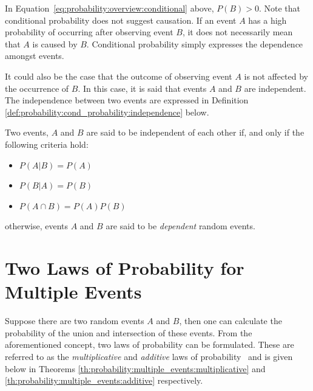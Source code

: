 \noindent
In Equation~\eqref{eq:probability:overview:conditional} above, $P(B) > 0$. Note that conditional probability does not suggest causation. If an event $A$ has a high probability of occurring after observing event $B$, it does not necessarily mean that $A$ is caused by $B$. Conditional probability simply expresses the dependence amongst events.

It could also be the case that the outcome of observing event $A$ is not affected by the occurrence of $B$. In this case, it is said that events $A$ and $B$ are independent. The independence between two events are expressed in Definition \ref{def:probability:cond_probability:independence} below.
\\
\begin{definition}
      \label{def:probability:cond_probability:independence}
      Two events, $A$ and $B$ are said to be independent of each other if, and only if the following criteria hold:

      \begin{itemize}
            \item $P(A \vert B) = P(A)$
            \item $P(B \vert A) = P(B)$
            \item $P(A \cap B) = P(A)P(B)$
      \end{itemize}

      \noindent
      otherwise, events $A$ and $B$ are said to be \textit{dependent} random events.
\end{definition}

\section{Two Laws of Probability for Multiple Events}\label{sec:probability:multiple_events}

Suppose there are two random events $A$ and $B$, then one can calculate the probability of the union and intersection of these events. From the aforementioned concept, two laws of probability can be formulated. These are referred to as the \textit{multiplicative} and \textit{additive} laws of probability~\cite{ref:wackerly:2014} and is given below in Theorems \ref{th:probability:multiple_events:multiplicative} and \ref{th:probability:multiple_events:additive} respectively.\\

